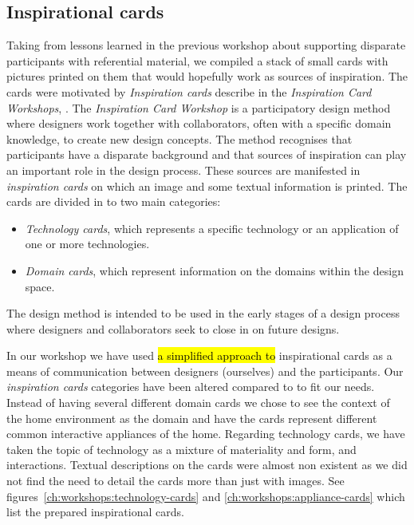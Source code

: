 \subsection{Inspirational cards}
\label{ch:workshops:workshop-ii:inspiration-cards}
Taking from lessons learned in the previous workshop about supporting disparate participants with referential material, we compiled a stack of small cards with pictures printed on them that would hopefully work as sources of inspiration.
The cards were motivated by \emph{Inspiration cards} describe in the \emph{Inspiration Card Workshops}, \citep{halskov2006inspiration}.
The \emph{Inspiration Card Workshop} is a participatory design method where designers work together with collaborators, often with a specific domain knowledge, to create new design concepts.
The method recognises that participants have a disparate background and that sources of inspiration can play an important role in the design process.
These sources are manifested in \emph{inspiration cards} on which an image and some textual information is printed.
The cards are divided in to two main categories:
\begin{itemize}
  \item{\emph{Technology cards}, which represents a specific technology or an application of one or more technologies.}
  \item{\emph{Domain cards}, which represent information on the domains within the design space.}
\end{itemize}
The design method is intended to be used in the early stages of a design process where designers and collaborators seek to close in on future designs.

In our workshop we have used \hl{a simplified approach to} inspirational cards as a means of communication between designers (ourselves) and the participants.
Our \emph{inspiration cards} categories have been altered compared to \citep{halskov2006inspiration} to fit our needs.
Instead of having several different domain cards we chose to see the context of the home environment as the domain and have the cards represent different common interactive appliances of the home.
Regarding technology cards, we have taken the topic of technology as a mixture of materiality and form, and interactions.
Textual descriptions on the cards were almost non existent as we did not find the need to detail the cards more than just with images.
See figures~\ref{ch:workshops:technology-cards} and \ref{ch:workshops:appliance-cards} which list the prepared inspirational cards.

